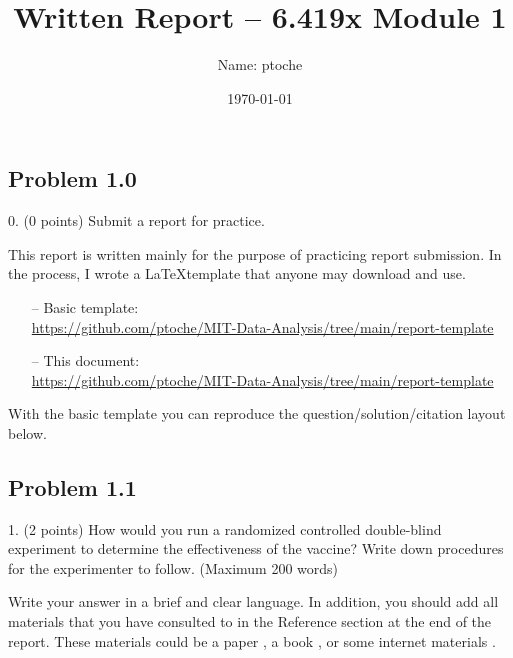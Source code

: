 \documentclass[11pt]{article}
\author{Name: ptoche}%
\title{Written Report – 6.419x Module 1}%
\date{\today}%
\begin{document}
\section*{\centering\thetitle}
\subsection*{\raggedleft\theauthor}

\subsection*{Problem 1.0}
\begin{question}
0. (0 points) 
Submit a report for practice. 
\end{question}

\begin{solution}
This report is written mainly for the purpose of practicing report submission. In the process, I wrote a \LaTeX template that anyone may download and use. 
\begin{itemize}
\item[--] Basic template:\\
\url{https://github.com/ptoche/MIT-Data-Analysis/tree/main/report-template}
\item[--] This document:\\
\url{https://github.com/ptoche/MIT-Data-Analysis/tree/main/report-template}
\end{itemize}
With the basic template you can reproduce the question/solution/citation layout below. 
\end{solution}

\sepline

\subsection*{Problem 1.1}
\begin{question}
1. (2 points) 
How would you run a randomized controlled double-blind experiment to determine the effectiveness of the vaccine? Write down procedures for the experimenter to follow. 
(Maximum 200 words)
\end{question}

\begin{solution}
Write your answer in a brief and clear language. In addition, you should add all materials that you have consulted to in the Reference section at the end of the report.  These materials could be a paper \cite{Wasserstein:2016}, a book \cite{Gustavii:2017}, or some internet materials \cite{Wiki:PCA}.
\end{solution}


\sepline


\printbibliography%
\end{document}

